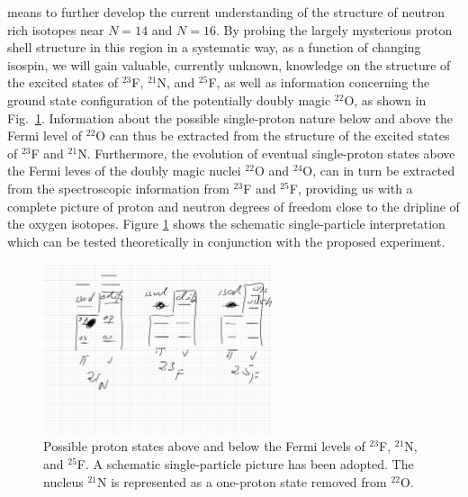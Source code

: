 \documentclass[prc,preprint,superscriptaddress,showpacs,floatfix]{revtex4-1}
\begin{document}
means to further develop the current understanding of the structure of
neutron rich isotopes near $N=14$ and $N=16$. By probing the largely
mysterious proton shell structure in this region in a systematic way,
as a function of changing isospin, we will gain valuable, currently
unknown, knowledge on the structure of the excited states of $^{23}$F,
$^{21}$N, and $^{25}$F, as well as information concerning the ground
state configuration of the potentially doubly magic $^{22}$O, as shown
in Fig.~\ref{fig:simplemodels}.  Information about the possible
single-proton nature below and above the Fermi level of $^{22}$O can
thus be extracted from the structure of the excited states of $^{23}$F
and $^{21}$N. Furthermore, the evolution of eventual single-proton
states above the Fermi leves of the doubly magic nuclei $^{22}$O and
$^{24}$O, can in turn be extracted from the spectroscopic information
from $^{23}$F and $^{25}$F, providing us with a complete picture of
proton and neutron degrees of freedom close to the dripline of the
oxygen isotopes. Figure \ref{fig:simplemodels} shows the schematic
single-particle interpretation which can be tested theoretically in conjunction with the proposed experiment.
\begin{figure} \label{fig:simplemodels}
       \begin{center}
		\includegraphics[width=0.6\textwidth, clip]{schematic.pdf}
	\end{center}
\caption{Possible proton states above and below the Fermi levels of  $^{23}$F, $^{21}$N, and $^{25}$F. A schematic single-particle picture has been adopted. The nucleus $^{21}$N is represented as a one-proton state removed from $^{22}$O.} 
\end{figure}
\end{document}
